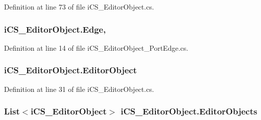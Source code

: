 Definition at line 73 of file i\+C\+S\+\_\+\+Editor\+Object.\+cs.

\hypertarget{classi_c_s___editor_object_a6410327e4a928143b187af860ca4df51}{
\subsubsection[{Edge}]{ i\+C\+S\+\_\+\+Editor\+Object.\+Edge\hspace{0.3cm}{\ttfamily [get]}, {\ttfamily [set]}}}\label{classi_c_s___editor_object_a6410327e4a928143b187af860ca4df51}


Definition at line 14 of file i\+C\+S\+\_\+\+Editor\+Object\+\_\+\+Port\+Edge.\+cs.

\hypertarget{classi_c_s___editor_object_af1d6e714525df8f8caf3cd18c3440c96}{
\subsubsection[{Editor\+Object}]{ i\+C\+S\+\_\+\+Editor\+Object.\+Editor\+Object\hspace{0.3cm}{\ttfamily [get]}}}\label{classi_c_s___editor_object_af1d6e714525df8f8caf3cd18c3440c96}


Definition at line 31 of file i\+C\+S\+\_\+\+Editor\+Object.\+cs.

\hypertarget{classi_c_s___editor_object_a5a97610d2d0a18cb42d705356b78b95b}{
\subsubsection[{Editor\+Objects}]{\setlength{\rightskip}{0pt plus 5cm}List$<${\bf i\+C\+S\+\_\+\+Editor\+Object}$>$ i\+C\+S\+\_\+\+Editor\+Object.\+Editor\+Objects\hspace{0.3cm}{\ttfamily [get]}}}\label{classi_c_s___editor_object_a5a97610d2d0a18cb42d705356b78b95b}


